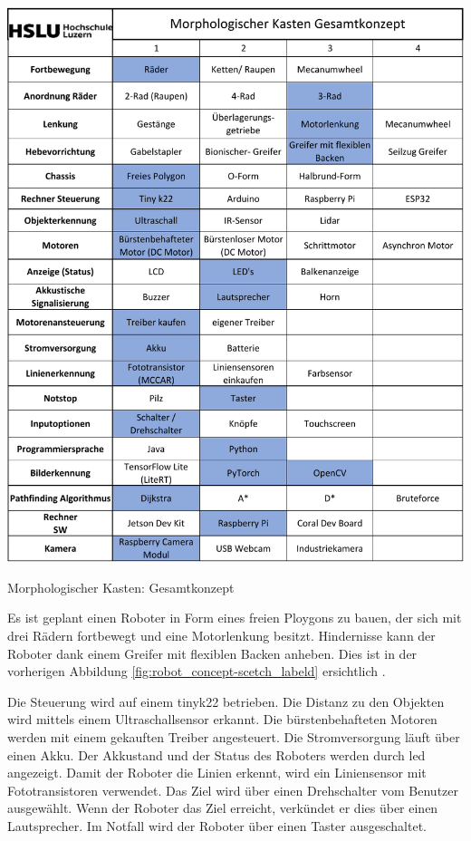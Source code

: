 \begin{table}[H]
\centering
\includegraphics[width=\textwidth -20mm]{assets/MK-all.pdf}
\caption{Morphologischer Kasten: Gesamtkonzept}
\label{table:mk-all}
\end{table}

Es ist geplant einen Roboter in Form eines freien Ploygons zu bauen, der sich mit drei Rädern fortbewegt und eine Motorlenkung besitzt. Hindernisse kann der Roboter dank einem Greifer mit flexiblen Backen anheben. Dies ist in der vorherigen Abbildung \ref{fig:robot_concept-scetch_labeld} ersichtlich .

Die Steuerung wird auf einem \acrshort{tinyk22} betrieben. Die Distanz zu den Objekten wird mittels einem Ultraschallsensor erkannt. Die bürstenbehafteten Motoren werden mit einem gekauften Treiber angesteuert. Die Stromversorgung läuft über einen Akku. Der Akkustand und der Status des Roboters werden durch \acrfull{led} angezeigt. Damit der Roboter die Linien erkennt, wird ein Liniensensor mit Fototransistoren verwendet. Das Ziel wird über einen Drehschalter vom Benutzer ausgewählt.
Wenn der Roboter das Ziel erreicht, verkündet er dies über einen Lautsprecher. Im Notfall wird der Roboter über einen Taster ausgeschaltet.

